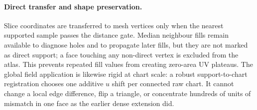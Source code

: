 \paragraph{Direct transfer and shape preservation.} Slice coordinates are transferred to mesh vertices only when the nearest supported sample passes the distance gate. Median neighbour fills remain available to diagnose holes and to propagate later fills, but they are not marked as direct support; a face touching any non-direct vertex is excluded from the atlas. This prevents repeated fill values from creating zero-area UV plateaus. The global field application is likewise rigid at chart scale: a robust support-to-chart registration chooses one additive $u$ shift per connected raw chart. It cannot change a local edge difference, flip a triangle, or concentrate hundreds of units of mismatch in one face as the earlier dense extension did.

